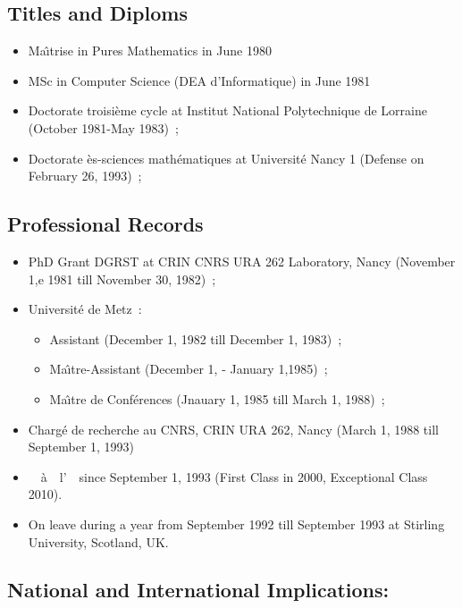\documentclass[ 12pt]{article}
\begin{document}
\subsection{Titles and Diploms}

\begin{itemize}
\item Ma\^{\i}trise in Pures Mathematics in June 1980
\item MSc in Computer Science (DEA d'Informatique) in June  1981
\item Doctorate troisi\`eme cycle  at Institut National Polytechnique de Lorraine  (October 1981-May 1983)~;
\item Doctorate \`es-sciences math\'ematiques at Universit\'e Nancy 1 (Defense on February 26, 1993)~;
\end{itemize}

\subsection{Professional Records}


\begin{itemize}
\item PhD Grant  DGRST  at  CRIN CNRS URA 262 Laboratory,   Nancy  (November 1,e 1981 till November 30, 1982)~;
\item Universit\'e de Metz~:
  \begin{itemize}
  \item Assistant  (December 1,  1982 till December 1,  1983)~;
  \item Ma\^{\i}tre-Assistant (December 1, - January 1,1985)~;
  \item Ma\^{\i}tre de Conf\'erences (Jnauary 1, 1985 till March 1, 1988)~;
  \end{itemize}
\item Charg\'e de recherche au CNRS, CRIN URA 262, Nancy (March 1, 1988 till  September 1, 1993)
\item \pr~~\`a~~l'~\inancyIesial\ since September 1, 1993 (First Class in 2000, Exceptional Class 2010).


\item On leave  during a year  from September 1992 till September 1993 at Stirling University, Scotland, UK.


\end{itemize}


\subsection{National and International Implications:}
\end{document}
